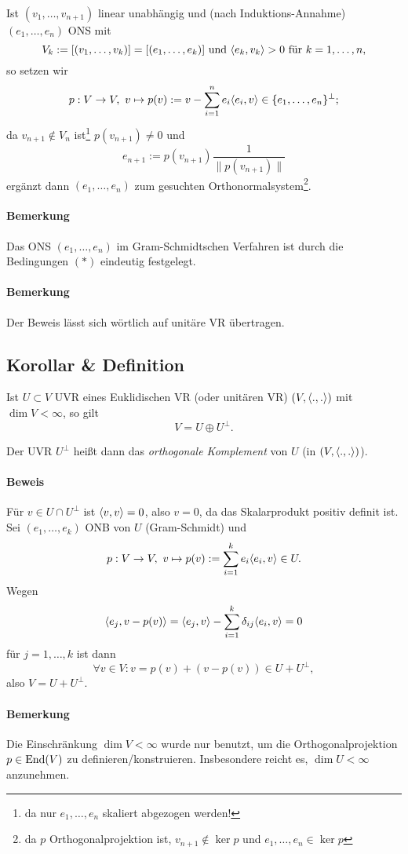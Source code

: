 	Ist $ (v_1,\dots,v_{n+1}) $ linear unabhängig und (nach Induktions-Annahme) $ (e_1,\dots,e_n) $ ONS mit
		\[ V_k := [(v_1,\dots,v_k)] = [(e_1,\dots,e_k)] \text{ und } \langle e_k,v_k \rangle > 0 \text{ für } k = 1,\dots,n, \]
	so setzen wir
		\[ p:V\to V,\ v\mapsto p(v):= v-\sum_{i=1}^{n}e_i\langle e_i,v \rangle\in \{e_1,\dots,e_n\}^\perp; \]
	da $ v_{n+1}\notin V_n $ ist\footnote{da nur $e_1,\dots,e_n$ skaliert abgezogen werden!}  $p(v_{n+1}) \neq 0$ und 
		\[e_{n+1} := p(v_{n+1})\frac{1}{\|p(v_{n+1})\|} \]
	ergänzt dann $ (e_1,\dots,e_n) $ zum gesuchten Orthonormalsystem\footnote{da $p$ Orthogonalprojektion ist, $v_{n+1}\notin \ker p$ und $e_1,\dots,e_n\in \ker p$}.
\paragraph{Bemerkung}
	Das ONS $ (e_1,\dots,e_n) $ im Gram-Schmidtschen Verfahren ist durch die Bedingungen $ (*) $ eindeutig festgelegt.
\paragraph{Bemerkung}
	Der Beweis lässt sich wörtlich auf unitäre VR übertragen.

\subsection{Korollar \& Definition}
\begin{Korollar}
	Ist $ U\subset V $ UVR eines Euklidischen VR (oder unitären VR) $ (V,\langle .,. \rangle) $ mit $ \dim V<\infty $, so gilt
		\[ V = U\oplus U^\perp. \]
\end{Korollar}
\begin{Definition}
	Der UVR $ U^\perp $ heißt dann das \emph{orthogonale Komplement} von $ U $ (in $ (V,\langle .,. \rangle) $).
\end{Definition}
\paragraph{Beweis}
	Für $ v\in U\cap U^\perp $ ist $ \langle v,v \rangle = 0 $, also $ v = 0 $, da das Skalarprodukt positiv definit ist. Sei $ (e_1,\dots,e_k) $ ONB von $ U $ (Gram-Schmidt) und
		\[ p:V\to V,\ v\mapsto p(v) := \sum_{i=1}^{k}e_i\langle e_i,v \rangle\in U. \]
	Wegen
		\[ \langle e_j,v-p(v) \rangle = \langle e_j,v \rangle-\sum_{i=1}^{k}\delta_{ij}\langle e_i,v \rangle = 0 \]
	für $ j = 1,\dots, k $ ist dann
		\[ \forall v\in V:v=p(v) + (v-p(v))\in U+U^\perp, \]
	also $ V = U+U^\perp $.
\paragraph{Bemerkung}
	Die Einschränkung $ \dim V < \infty $ wurde nur benutzt, um die Orthogonalprojektion $ p\in \operatorname{End}(V) $ zu definieren/konstruieren. Insbesondere reicht es, $ \dim U < \infty $ anzunehmen.
